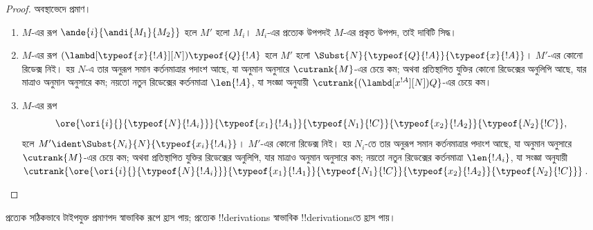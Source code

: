 \documentclass[../../../include/open-logic-section]{subfiles}
\begin{document}
\begin{proof}
  অবস্থাভেদে প্রমাণ।
  \begin{enumerate}
  \item $M$-এর রূপ $\ande{i}{\andi{M_1}{M_2}}$ হলে
    $M'$ হলো $M_i$। $M_i$-এর প্রত্যেক উপপদই
    $M$-এর প্রকৃত উপপদ, তাই দাবিটি সিদ্ধ।
  \item $M$-এর রূপ
    $(\lambd[\typeof{x}{!A}][N])\typeof{Q}{!A}$ হলে $M'$ হলো
    $\Subst{N}{\typeof{Q}{!A}}{\typeof{x}{!A}}$।
    $M'$-এর কোনো রিডেক্স নিই। হয় $N$-এ
    তার অনুরূপ সমান কর্তনমাত্রার পদাংশ আছে, যা
    অনুমান অনুসারে $\cutrank{M}$-এর চেয়ে কম; অথবা
    প্রতিস্থাপিত যুক্তির কোনো রিডেক্সের অনুলিপি আছে, যার মাত্রাও
    অনুমান অনুসারে কম; নয়তো নতুন রিডেক্সের কর্তনমাত্রা $\len{!A}$, যা সংজ্ঞা অনুযায়ী
    $\cutrank{(\lambd[x^{!A}][N])Q}$-এর চেয়ে কম।
  \item $M$-এর রূপ
    \[
    \ore{\ori{i}{}{\typeof{N}{!A_i}}}
        {\typeof{x_1}{!A_1}}{\typeof{N_1}{!C}}
        {\typeof{x_2}{!A_2}}{\typeof{N_2}{!C}},
    \]
    হলে $M' \ident \Subst{N_i}{N}{\typeof{x_i}{!A_i}}$।
    $M'$-এর কোনো রিডেক্স নিই। হয় $N_i$-তে
    তার অনুরূপ সমান কর্তনমাত্রার পদাংশ আছে, যা
    অনুমান অনুসারে $\cutrank{M}$-এর চেয়ে কম; অথবা প্রতিস্থাপিত
    যুক্তির রিডেক্সের অনুলিপি, যার মাত্রাও অনুমান অনুসারে কম;
    নয়তো নতুন রিডেক্সের কর্তনমাত্রা $\len{!A_i}$, যা সংজ্ঞা অনুযায়ী
    $\cutrank{\ore{\ori{i}{}{\typeof{N}{!A_i}}}
      {\typeof{x_1}{!A_1}}{\typeof{N_1}{!C}}
      {\typeof{x_2}{!A_2}}{\typeof{N_2}{!C}}}$.
  \end{enumerate}
\end{proof}

\begin{thm}
  প্রত্যেক সঠিকভাবে টাইপযুক্ত প্রমাণপদ স্বাভাবিক রূপে হ্রাস পায়;
  প্রত্যেক !!{derivation}s স্বাভাবিক !!{derivation}sতে
  হ্রাস পায়।
\end{thm}
\end{document}
